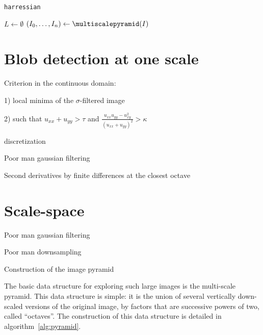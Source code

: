 \documentclass[a4paper]{article}
\begin{document}
\begin{algorithm}
	\caption{\texttt{harressian}}
	\label{alg:hilevel}
	\DontPrintSemicolon
	\BlankLine
	$L\gets\emptyset$\;
	$(I_0,\ldots,I_n)\gets\multiscalepyramid(I)$\;
	\;
\end{algorithm}


\section{Blob detection at one scale}

Criterion in the continuous domain:

1) local minima of the $\sigma$-filtered image

2) such that $u_{xx}+u_{yy} > \tau$ and
$\frac{u_{xx}u_{yy}-u_{xy}^2}{(u_{xx}+u_{yy})^2}>\kappa$

discretization

Poor man gaussian filtering

Second derivatives by finite differences at the closest octave


\section{Scale-space}

Poor man gaussian filtering

Poor man downsampling

Construction of the image pyramid

The basic data structure for exploring such large images is the multi-scale
pyramid. This data structure is simple: it is the union of several
vertically down-scaled versions of the original image, by factors that are
successive powers of two, called ``octaves''.  The construction of this
data structure is detailed in algorithm~\ref{alg:pyramid}.
\end{document}
